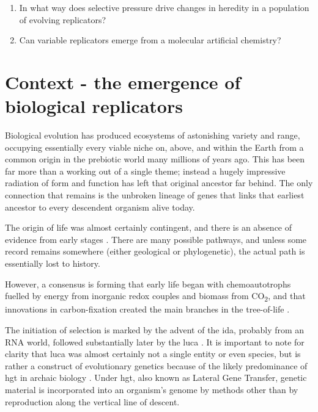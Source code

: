 \begin{enumerate}
\item In what way does selective pressure drive changes in heredity in a population of evolving replicators?
\item Can variable replicators emerge from a molecular artificial chemistry?
\end{enumerate}

\section{Context - the emergence of biological replicators}\label{context}

Biological evolution has produced ecosystems of astonishing variety and range, occupying essentially every viable niche on, above, and within the Earth from a common origin in the prebiotic world many millions of years ago. This has been far more than a working out of a single theme; instead a hugely impressive radiation of form and function has left that original ancestor far behind. The only connection that remains is the unbroken lineage of genes that links that earliest ancestor to every descendent organism alive today.

The origin of life was almost certainly contingent, and there is an absence of evidence from early stages \parencite{Pross2013}. There are many possible pathways, and unless some record remains somewhere (either geological or phylogenetic), the actual path is essentially lost to history.

However, a consensus is forming that early life began with chemoautotrophs fuelled by energy from inorganic redox couples and biomass from CO\textsubscript{2}, and that innovations in carbon-fixation created the main branches in the tree-of-life \parencite{Braakman2012}. 

The initiation of selection is marked by the advent of the \gls{ida}, probably from an RNA world, followed substantially later by the \gls{luca} \parencite{Yarus2011}. It is important to note for clarity that \gls{luca} was almost certainly not a single entity or even species, but is rather a construct of evolutionary genetics because of the likely predominance of \gls{hgt} in archaic biology \parencite{Doolittle2007}. Under \gls{hgt}, also known as Lateral Gene Transfer, genetic material is incorporated into an organism's genome by methods other than by reproduction along the vertical line of descent.

